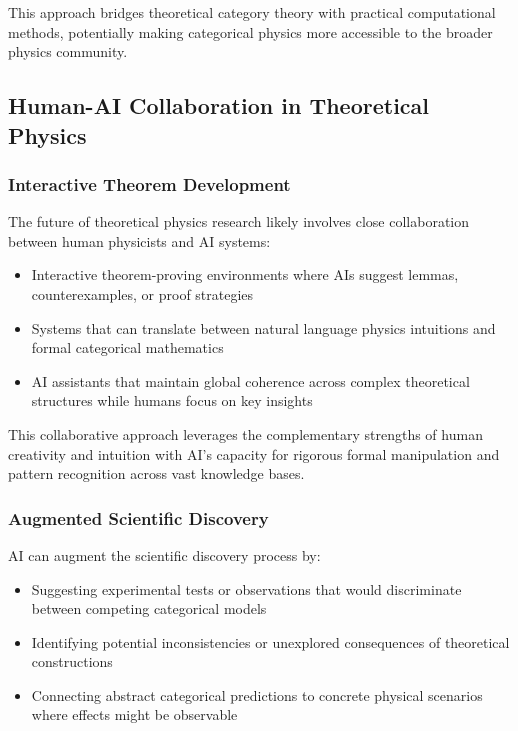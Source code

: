 This approach bridges theoretical category theory with practical computational methods, potentially making categorical physics more accessible to the broader physics community.

\subsection{Human-AI Collaboration in Theoretical Physics}

\subsubsection{Interactive Theorem Development}

The future of theoretical physics research likely involves close collaboration between human physicists and AI systems:

\begin{itemize}
    \item Interactive theorem-proving environments where AIs suggest lemmas, counterexamples, or proof strategies
    \item Systems that can translate between natural language physics intuitions and formal categorical mathematics
    \item AI assistants that maintain global coherence across complex theoretical structures while humans focus on key insights
\end{itemize}

This collaborative approach leverages the complementary strengths of human creativity and intuition with AI's capacity for rigorous formal manipulation and pattern recognition across vast knowledge bases.

\subsubsection{Augmented Scientific Discovery}

AI can augment the scientific discovery process by:

\begin{itemize}
    \item Suggesting experimental tests or observations that would discriminate between competing categorical models
    \item Identifying potential inconsistencies or unexplored consequences of theoretical constructions
    \item Connecting abstract categorical predictions to concrete physical scenarios where effects might be observable
\end{itemize}

